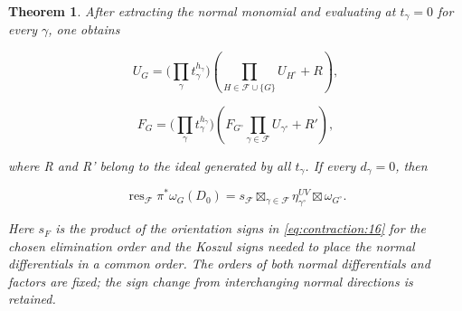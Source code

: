 \documentclass[11pt,a4paper,oneside]{article}
\theoremstyle{plain}
\newtheorem{theorem}{Theorem}[section]
\theoremstyle{definition}
\theoremstyle{remark}
\numberwithin{equation}{section}
\begin{document}
\begin{theorem}

\label{thm:contraction:6.1} After extracting the normal monomial and evaluating at \(t_\gamma =0\) for every \(\gamma \), one obtains

\begin{equation}
U_G=\Big(\prod_\gamma t_\gamma^{h_\gamma}\Big)
       \left(\prod_{H\in\mathscr F\cup\{G\}}U_{H^\circ}+R\right),
\end{equation}

\begin{equation}
F_G=\Big(\prod_\gamma t_\gamma^{h_\gamma}\Big)
       \left(F_{G^\circ}\prod_{\gamma\in\mathscr F}U_{\gamma^\circ}
                                                       +R'\right),          \label{eq:contraction:23}
\end{equation}

where R and R' belong to the ideal generated by all \(t_\gamma \). If every \(d_\gamma =0\), then

\begin{equation}
\operatorname{res}_{\mathscr F}\pi^*\omega_G(D_0)
        =s_{\mathscr F}\mathop{\boxtimes}_{\gamma\in\mathscr F}\eta_{\gamma^\circ}^{UV}
                                                \boxtimes\omega_{G^\circ}.
                                                                    \label{eq:contraction:24}
\end{equation}

Here \(s_F\) is the product of the orientation signs in \eqref{eq:contraction:16} for the chosen elimination order and the Koszul signs needed to place the normal differentials in a common order. The orders of both normal differentials and factors are fixed; the sign change from interchanging normal directions is retained.

\end{theorem}
\end{document}
